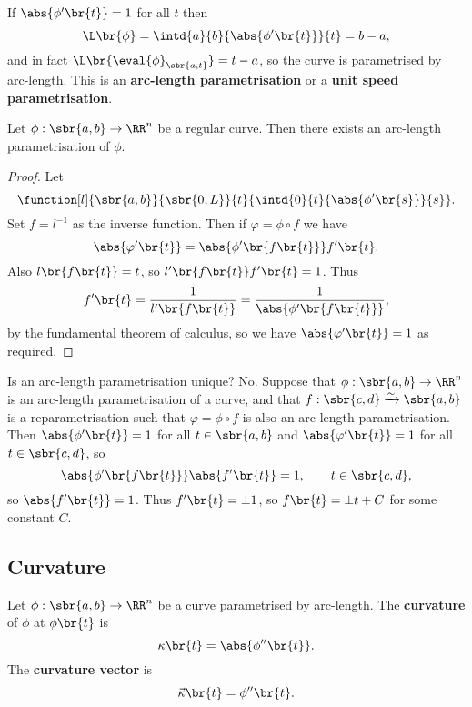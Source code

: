 If $ \abs{\phi'\br{t}} = 1 $ for all $ t $ then
$$ \L\br{\phi} = \intd{a}{b}{\abs{\phi'\br{t}}}{t} = b - a, $$
and in fact $ \L\br{\eval{\phi}_{\sbr{a, t}}} = t - a $, so the curve is parametrised by arc-length. This is an \textbf{arc-length parametrisation} or a \textbf{unit speed parametrisation}.

\begin{proposition}
Let $ \phi : \sbr{a, b} \to \RR^n $ be a regular curve. Then there exists an arc-length parametrisation of $ \phi $.
\end{proposition}

\begin{proof}
Let
$$ \function[l]{\sbr{a, b}}{\sbr{0, L}}{t}{\intd{0}{t}{\abs{\phi'\br{s}}}{s}}. $$
Set $ f = l^{-1} $ as the inverse function. Then if $ \varphi = \phi \circ f $ we have
$$ \abs{\varphi'\br{t}} = \abs{\phi'\br{f\br{t}}}f'\br{t}. $$
Also $ l\br{f\br{t}} = t $, so $ l'\br{f\br{t}}f'\br{t} = 1 $. Thus
$$ f'\br{t} = \dfrac{1}{l'\br{f\br{t}}} = \dfrac{1}{\abs{\phi'\br{f\br{t}}}}, $$
by the fundamental theorem of calculus, so we have $ \abs{\varphi'\br{t}} = 1 $ as required.
\end{proof}


Is an arc-length parametrisation unique? No. Suppose that $ \phi : \sbr{a, b} \to \RR^n $ is an arc-length parametrisation of a curve, and that $ f : \sbr{c, d} \xrightarrow{\sim} \sbr{a, b} $ is a reparametrisation such that $ \varphi = \phi \circ f $ is also an arc-length parametrisation. Then $ \abs{\phi'\br{t}} = 1 $ for all $ t \in \sbr{a, b} $ and $ \abs{\varphi'\br{t}} = 1 $ for all $ t \in \sbr{c, d} $, so
$$ \abs{\phi'\br{f\br{t}}}\abs{f'\br{t}} = 1, \qquad t \in \sbr{c, d}, $$
so $ \abs{f'\br{t}} = 1 $. Thus $ f'\br{t} = \pm 1 $, so $ f\br{t} = \pm t + C $ for some constant $ C $.

\pagebreak

\subsection{Curvature}

\begin{definition}
Let $ \phi : \sbr{a, b} \to \RR^n $ be a curve parametrised by arc-length. The \textbf{curvature} of $ \phi $ at $ \phi\br{t} $ is
$$ \kappa\br{t} = \abs{\phi''\br{t}}. $$
The \textbf{curvature vector} is
$$ \vec{\kappa}\br{t} = \phi''\br{t}. $$
\end{definition}

